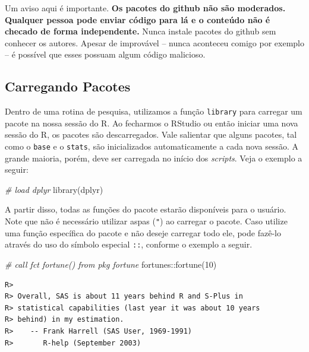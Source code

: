 \documentclass[
  11pt,
]{book}
\newenvironment{Shaded}{\begin{snugshade}}{\end{snugshade}}
\newcommand{\CommentTok}[1]{\textcolor[rgb]{0.37,0.37,0.37}{\textit{#1}}}
\newcommand{\DecValTok}[1]{\textcolor[rgb]{0.06,0.06,0.06}{#1}}
\newcommand{\FunctionTok}[1]{\textcolor[rgb]{0,0,0}{#1}}
\newcommand{\NormalTok}[1]{#1}
\newcommand{\SpecialCharTok}[1]{\textcolor[rgb]{0,0,0}{#1}}
\newenvironment{rmdcaution}
{\begin{cautionblock}

} {\end{cautionblock}}
\begin{document}
\begin{rmdcaution}
Um aviso aqui é importante. \textbf{Os pacotes do github não são
moderados. Qualquer pessoa pode enviar código para lá e o conteúdo não é
checado de forma independente.} Nunca instale pacotes do github sem
conhecer os autores. Apesar de improvável -- nunca aconteceu comigo por
exemplo -- é possível que esses possuam algum código malicioso.
\end{rmdcaution}

\hypertarget{carregando-pacotes}{%
\subsection{Carregando Pacotes}\label{carregando-pacotes}}

Dentro de uma rotina de pesquisa, utilizamos a função \texttt{library} para carregar um pacote na nossa sessão do R. Ao fecharmos o RStudio ou então iniciar uma nova sessão do R, os pacotes são descarregados. Vale salientar que alguns pacotes, tal como o \texttt{base} e o \texttt{stats}, são inicializados automaticamente a cada nova sessão. A grande maioria, porém, deve ser carregada no início dos \emph{scripts}. Veja o exemplo a seguir:

\begin{Shaded}
\begin{Highlighting}[]
\CommentTok{\# load dplyr}
\FunctionTok{library}\NormalTok{(dplyr)}
\end{Highlighting}
\end{Shaded}

A partir disso, todas as funções do pacote estarão disponíveis para o usuário. Note que não é necessário utilizar aspas (\texttt{"}) ao carregar o pacote. Caso utilize uma função específica do pacote e não deseje carregar todo ele, pode fazê-lo através do uso do símbolo especial \texttt{::}, conforme o exemplo a seguir.

\begin{Shaded}
\begin{Highlighting}[]
\CommentTok{\# call fct fortune() from pkg fortune}
\NormalTok{fortunes}\SpecialCharTok{::}\FunctionTok{fortune}\NormalTok{(}\DecValTok{10}\NormalTok{)}
\end{Highlighting}
\end{Shaded}

\begin{verbatim}
R> 
R> Overall, SAS is about 11 years behind R and S-Plus in
R> statistical capabilities (last year it was about 10 years
R> behind) in my estimation.
R>    -- Frank Harrell (SAS User, 1969-1991)
R>       R-help (September 2003)
\end{verbatim}
\end{document}

